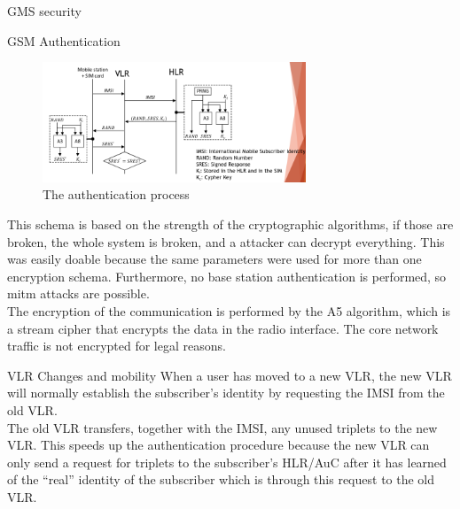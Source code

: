 \begin{section}{GMS security}
\begin{subsection}{GSM Authentication}
    \begin{figure}[h]
      \centering
      \includegraphics[width=0.7\textwidth]{img/wireless/gms auth.png}
      \caption{The authentication process}
      \label{fig:authentication}
    \end{figure}
    This schema is based on the strength of the cryptographic algorithms, if those are broken, the
    whole system is broken, and a attacker can decrypt everything. This was easily doable because
    the same parameters were used for more than one encryption schema. Furthermore, no base station
    authentication is performed, so mitm attacks are possible.\\
    The encryption of the communication is performed by the A5 algorithm, which is a stream cipher
    that encrypts the data in the radio interface. The core network traffic is not encrypted for
    legal reasons.
    \begin{subsubsection}{VLR Changes and mobility}
      When a user has moved to a new VLR, the new VLR will normally establish the subscriber’s
      identity by requesting the IMSI from the old VLR.\\
       The old VLR transfers, together with the IMSI, any unused triplets to the new VLR. This
       speeds up the authentication procedure because the new VLR can only send a request for
       triplets to the subscriber’s HLR/AuC after it has learned of the “real” identity of the
       subscriber which is through this request to the old VLR.

    \end{subsubsection}

   \end{subsection}


\end{section}

